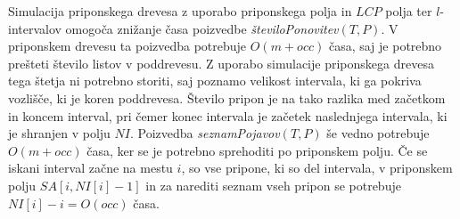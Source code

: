 Simulacija priponskega drevesa z uporabo priponskega polja in $LCP$ polja ter $l$-intervalov omogoča znižanje časa poizvedbe \textit{številoPonovitev}$(T,P)$. V priponskem drevesu ta poizvedba potrebuje $O(m+occ)$ časa, saj je potrebno prešteti število listov v poddrevesu. Z uporabo simulacije priponskega drevesa tega štetja ni potrebno storiti, saj poznamo velikost intervala, ki ga pokriva vozlišče, ki je koren poddrevesa. Število pripon je na tako razlika med začetkom in koncem interval, pri čemer konec intervala je začetek naslednjega intervala, ki je shranjen v polju $NI$. Poizvedba \textit{seznamPojavov}$(T,P)$ še vedno potrebuje $O(m+occ)$ časa, ker se je potrebno sprehoditi po priponskem polju. Če se iskani interval začne na mestu $i$, so vse pripone, ki so del intervala, v priponskem polju $SA[i, NI[i]-1]$ in za narediti seznam vseh pripon se potrebuje $NI[i]-i=O(occ)$ časa.
